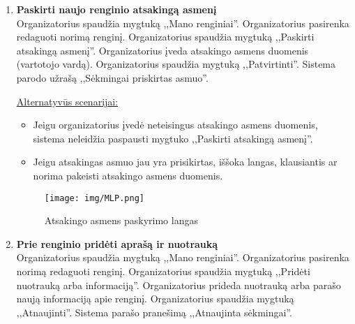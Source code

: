 \documentclass{VUMIFPSkursinis}
\begin{document}
\begin{enumerate} [label = \textbf{U\arabic*.}]
				\underline{Alternatyvūs scenarijai:}
				\begin{itemize}
					\item Jeigu informacija yra neteisinga arba nepilnai užpildyta, sistema neleidžia paspausti mygtuko ,,Paskelbti renginį''.
				\end{itemize}
				
				\begin{figure}[H]
					\centering
					\texttt{[image: img/MLP.png]}
					\caption{Naujo renginio langas}
					\label{fig:paskelbti-nauja-rengini}
				\end{figure}
				\newpage
			\item \textbf{Paskirti naujo renginio atsakingą asmenį} \\
				Organizatorius spaudžia mygtuką ,,Mano renginiai''. 
				Organizatorius pasirenka redaguoti norimą renginį.
				Organizatorius spaudžia mygtuką ,,Paskirti atsakingą asmenį''. 
				Organizatorius įveda atsakingo asmens duomenis (vartotojo vardą).
				Organizatorius spaudžia mygtuką ,,Patvirtinti''.
				Sistema parodo užrašą ,,Sėkmingai priskirtas asmuo''.
				
				\underline{Alternatyvūs scenarijai:}
				\begin{itemize}
					\item Jeigu organizatorius įvedė neteisingus atsakingo asmens duomenis, sistema neleidžia paspausti mygtuko ,,Paskirti atsakingą asmenį''.
					\item Jeigu atsakingas asmuo jau yra prisikirtas, iššoka langas, klausiantis ar norima pakeisti atsakingo asmens duomenis.
				\end{itemize}
				
				\begin{figure}[H]
					\centering
					\texttt{[image: img/MLP.png]}
					\caption{Atsakingo asmens paskyrimo langas}
					\label{fig:paskirti-atsakinga-asmeni}
				\end{figure}
				
			\item \textbf{Prie renginio pridėti aprašą ir nuotrauką} \\
				Organizatorius spaudžia mygtuką ,,Mano renginiai''. 
				Organizatorius pasirenka norimą redaguoti renginį.
				Organizatorius spaudžia mygtuką ,,Pridėti nuotrauką arba informaciją''. 
				Organizatorius prideda nuotrauką arba parašo naują informaciją apie renginį.
				Organizatorius spaudžia mygtuką ,,Atnaujinti''. 
				Sistema parašo pranešimą ,,Atnaujinta sėkmingai''.
				

\end{enumerate}
\end{document}
